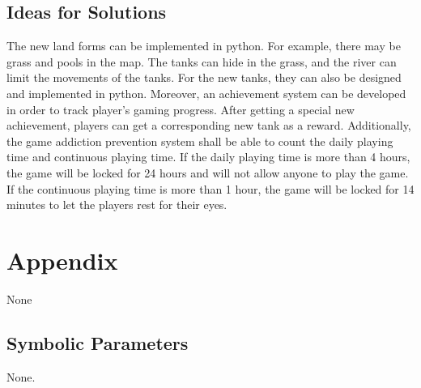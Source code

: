 \documentclass[12pt, titlepage]{article}
\begin{document}
\subsection{Ideas for Solutions}
The new land forms can be implemented in python. For example, there may be grass and pools in the map. The tanks can hide in the grass, and the river can limit the movements of the tanks. For the new tanks, they can also be designed and implemented in python. Moreover, an achievement system can be developed in order to track player's gaming progress. After getting a special new achievement, players can get a corresponding new tank as a reward. Additionally, the game addiction prevention system shall be able to count the daily playing time and continuous playing time. If the daily playing time is more than 4 hours, the game will be locked for 24 hours and will not allow anyone to play the game. If the continuous playing time is more than 1 hour, the game will be locked for 14 minutes to let the players rest for their eyes.





\newpage

\section{Appendix}
None

\subsection{Symbolic Parameters}

None.
\end{document}
